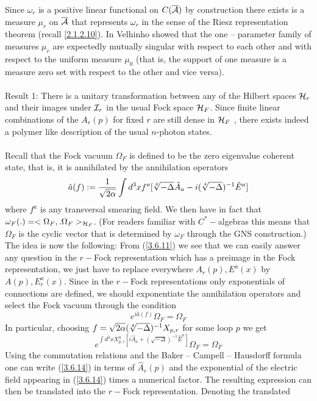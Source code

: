 \documentclass[12pt]{report}
\def\be{\begin{equation}}
\def\ee{\end{equation}}
\def\a{{\cal A}}
\def\ab{\overline{\a}}
\begin{document}
Since $\omega_r$ is a positive linear functional on $C(\ab)$
by construction
there exists is a measure $\mu_r$ on $\ab$ that represents
$\omega_r$ in the sense of the Riesz 
representation theorem (recall \ref{2.1.2.10}). In \cite{70} Velhinho
showed that the one -- parameter family of measures
$\mu_r$ are expectedly mutually singular with respect to each
other and with respect to the uniform measure $\mu_0$ (that is, the 
support of one measure is a measure zero set with respect to the other 
and vice versa).\\
\\
Result 1: There is a unitary transformation between any of the Hilbert 
spaces ${\cal H}_r$ and their images under ${\cal I}_r$ in the usual Fock 
space ${\cal H}_F$. Since finite linear combinations of the 
$A_r(p)$ for fixed $r$ are still dense in ${\cal H}_F$ \cite{69}, there 
exists indeed a 
polymer like description of the usual $n$-photon states.\\
\\ 
Recall that the Fock vacuum $\Omega_F$ is defined to be the zero eigenvalue
coherent state, that is, it is annihilated by the annihilation operators
\be \label{3.6.12}
\hat{a}(f):=\frac{1}{\sqrt{2\alpha}}
\int d^3x f^a[\root 4\of{-\Delta} \hat{A}_a
-i(\root 4\of{-\Delta})^{-1}\hat{E}^a]
\ee
where $f^a$ is any transversal smearing field. We then have in
fact that $\omega_F(.)=<\Omega_F,.\Omega_F>_{{\cal H}_F}$. (For readers
familiar with $C^\ast-$algebras this means that 
$\Omega_F$ is the cyclic vector that is determined by $\omega_F$ through
the GNS construction.)
The idea is now the following: From (\ref{3.6.11}) we see that we can
easily answer any question in the $r-$Fock representation which has a
preimage in the Fock representation, we just have to replace
everywhere $A_r(p),E^a(x)$ by $A(p),E^a_r(x)$.
Since in the $r-$Fock representations only exponentials of connections
are defined, we should exponentiate the annihilation operators
and select the Fock vacuum through the condition
\be \label{3.6.13}
e^{i\hat{a}(f)}\Omega_F=\Omega_F
\ee
In particular, choosing $f=\sqrt{2\alpha}(\root 4\of{-\Delta})^{-1} X_{p,r}$
for some loop $p$ we get
\be \label{3.6.14}
e^{\int d^3x X^a_{p,r}[i\hat{A}_a+(\sqrt{-\Delta})^{-1}\hat{E}^a]}
\Omega_F
=\Omega_F
\ee
Using the commutation relations and the Baker -- Campell -- Hausdorff
formula one can write (\ref{3.6.14}) in terms of $\hat{A}_r(p)$
and the exponential of the electric field appearing in (\ref{3.6.14})
times a numerical factor. The resulting expression can then be
translated into the $r-$Fock representation. Denoting the translated 
\end{document}
